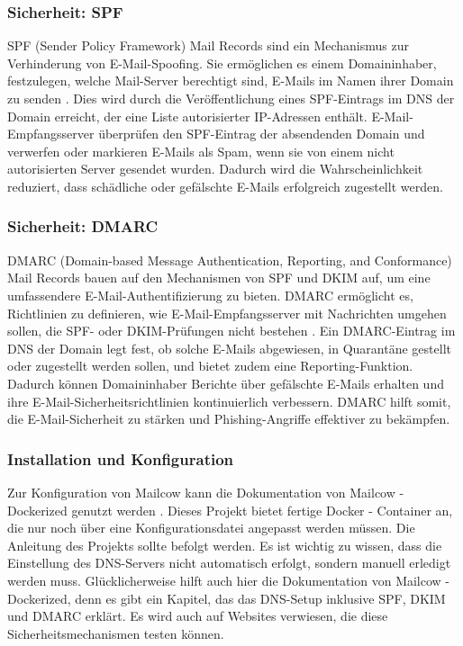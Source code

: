 \subsubsection{Sicherheit: SPF}
SPF (Sender Policy Framework) Mail Records sind ein Mechanismus zur Verhinderung von E-Mail-Spoofing. Sie ermöglichen es einem Domaininhaber, festzulegen, welche Mail-Server berechtigt sind, E-Mails im Namen ihrer Domain zu senden \cite{spfErklaerung}. Dies wird durch die Veröffentlichung eines SPF-Eintrags im DNS der Domain erreicht, der eine Liste autorisierter IP-Adressen enthält. E-Mail-Empfangsserver überprüfen den SPF-Eintrag der absendenden Domain und verwerfen oder markieren E-Mails als Spam, wenn sie von einem nicht autorisierten Server gesendet wurden. Dadurch wird die Wahrscheinlichkeit reduziert, dass schädliche oder gefälschte E-Mails erfolgreich zugestellt werden.

\subsubsection{Sicherheit: DMARC}
DMARC (Domain-based Message Authentication, Reporting, and Conformance) Mail Records bauen auf den Mechanismen von SPF und DKIM auf, um eine umfassendere E-Mail-Authentifizierung zu bieten. DMARC ermöglicht es, Richtlinien zu definieren, wie E-Mail-Empfangsserver mit Nachrichten umgehen sollen, die SPF- oder DKIM-Prüfungen nicht bestehen \cite{dmarcErklaerung}. Ein DMARC-Eintrag im DNS der Domain legt fest, ob solche E-Mails abgewiesen, in Quarantäne gestellt oder zugestellt werden sollen, und bietet zudem eine Reporting-Funktion. Dadurch können Domaininhaber Berichte über gefälschte E-Mails erhalten und ihre E-Mail-Sicherheitsrichtlinien kontinuierlich verbessern. DMARC hilft somit, die E-Mail-Sicherheit zu stärken und Phishing-Angriffe effektiver zu bekämpfen.

\subsubsection{Installation und Konfiguration}
Zur Konfiguration von Mailcow kann die Dokumentation von Mailcow - Dockerized genutzt werden \cite{mailcowDockerizedDNS}. Dieses Projekt bietet fertige Docker - Container an, die nur noch über eine Konfigurationsdatei angepasst werden müssen. Die Anleitung des Projekts sollte befolgt werden. Es ist wichtig zu wissen, dass die Einstellung des DNS-Servers nicht automatisch erfolgt, sondern manuell erledigt werden muss. Glücklicherweise hilft auch hier die Dokumentation von Mailcow - Dockerized, denn es gibt ein Kapitel, das das DNS-Setup inklusive SPF, DKIM und DMARC erklärt. Es wird auch auf Websites verwiesen, die diese Sicherheitsmechanismen testen können.

